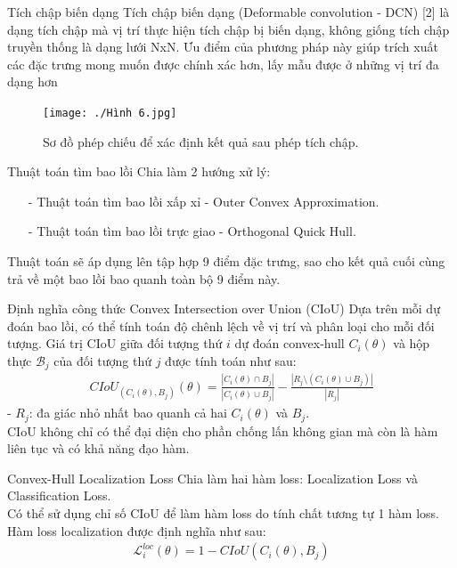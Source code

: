 \documentclass[11pt]{beamer}
\theoremstyle{definition}
\theoremstyle{plain}
\theoremstyle{plain}
\theoremstyle{remark}
\begin{document}
\begin{frame}{Tích chập biến dạng}
Tích chập biến dạng (Deformable convolution - DCN) [2] là dạng tích chập
mà vị trí thực hiện tích chập bị biến dạng, không giống tích chập truyền thống
là dạng lưới NxN. Ưu điểm của phương pháp này giúp trích xuất các đặc trưng
mong muốn được chính xác hơn, lấy mẫu được ở những vị trí đa dạng hơn 

\begin{figure}[ht!]
	\begin{center}
		\texttt{[image: ./Hình 6.jpg]}
		\caption{Sơ đồ phép chiếu để xác định kết quả sau phép tích chập.}
		\label{fig_dhandang6 }
	\end{center}
\end{figure}

\end{frame}


\begin{frame}{Thuật toán tìm bao lồi}
Chia làm 2 hướng xử lý:
\begin{itemize}
	\item[-] Thuật toán tìm bao lồi xấp xỉ - Outer Convex Approximation.
	
	\item[-]  Thuật toán tìm bao lồi trực giao - Orthogonal Quick Hull.
	
\end{itemize}
Thuật toán sẽ áp dụng lên tập hợp 9 điểm đặc trưng, sao cho kết quả cuối cùng trả về một bao lồi bao quanh toàn bộ 9 điểm này.
\end{frame}

\begin{frame}{Định nghĩa công thức Convex Intersection over Union (CIoU)}
Dựa trên mỗi dự đoán bao lồi, có thể tính toán độ chênh lệch về vị trí và phân loại cho mỗi đối tượng. Giá trị CIoU giữa đối tượng thứ $i$ dự đoán convex-hull $C_i (\theta)$ và hộp thực $\mathcal{B}_j$ của đối tượng thứ $j$ được tính toán như sau:
\begin{align} \label{ptdd}
	CIoU_{(C_i (\theta), B_j)} (\theta) = \frac{|C_i(\theta) \cap B_j|}{|C_i(\theta) \cup B_j|} - \frac{|R_j \setminus (C_i(\theta) \cup B_j)|}{|R_j|}
\end{align}
- $R_j$: đa giác nhỏ nhất bao quanh cả hai $C_i(\theta)$ và $B_j$.\\
CIoU không chỉ có thể đại diện cho phần chống lấn không gian mà còn là hàm liên tục và có khả năng đạo hàm.
\end{frame}


\begin{frame}{Convex-Hull Localization Loss}
Chia làm hai hàm loss: Localization Loss và Classification Loss.\\
 Có thể sử dụng chỉ số CIoU để làm hàm loss do tính chất tương tự 1 hàm loss.\\
 Hàm loss localization được định nghĩa như sau:
\begin{align} \label{ptdd0}
	\mathcal{L}_i^{loc} (\theta) = 1 - CIoU(C_i(\theta), B_j)
\end{align}

\end{frame}
\end{document}
